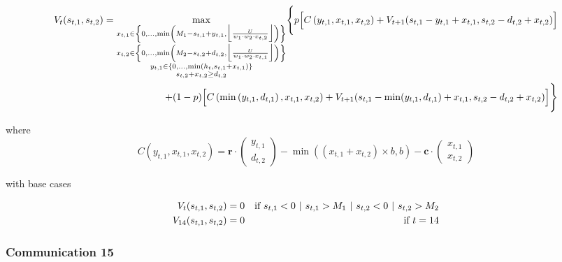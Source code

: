 \documentclass{article}
\newcommand{\bs}[1]{\boldsymbol{#1}} %
\begin{document}
\begin{align*}
    V_t(s_{t,1},s_{t,2}) = \underset{\substack{x_{t,1} \in \left\{0,...,\min\left(M_1 - s_{t,1} + y_{t,1},\Big\lfloor \frac{U}{w_1\cdot w_2 \cdot x_{t,2}} \Big\rfloor\right)\right\} \\ x_{t,2} \in \left\{0,...,\min\left(M_2 - s_{t,2} + d_{t,2}, \Big\lfloor \frac{U}{w_1\cdot w_2\cdot x_{t,1}} \Big\rfloor\right)\right\} \\ y_{t,1} \in \left\{0,...,\min\left(h_{t}, s_{t,1} + x_{t,1}\right)\right\} \\ s_{t,2} + x_{t,2} \geq d_{t,2} }}{\max} \Biggl\{p \Bigl[C\left(y_{t,1}, x_{t,1}, x_{t,2}\right) + V_{t+1}(s_{t,1} - y_{t,1}+x_{t,1}, s_{t,2} - d_{t,2} + x_{t,2}) \Bigr] \Biggr. \\
    \Biggl.+ (1-p)\Bigl[ C\left(\min\left(y_{t,1},d_{t,1}\right), x_{t,1}, x_{t,2}\right) + V_{t+1}(s_{t,1} - \min(y_{t,1},d_{t,1})+x_{t,1}, s_{t,2} - d_{t,2} + x_{t,2})  \Bigr] \Biggr\} 
\end{align*}

where
$$C(y_{t,1}, x_{t,1}, x_{t,2}) = \bs{r}\cdot\begin{pmatrix}y_{t,1}\\d_{t,2}\end{pmatrix} - \min\left((x_{t,1} + x_{t,2}) \times b, b\right) - \bs{c}\cdot\begin{pmatrix}x_{t,1}\\x_{t,2}\end{pmatrix}$$


with base cases

\begin{align}
    V_t(s_{t,1},s_{t,2}) &= 0 & \text{if } s_{t,1} < 0 \hspace{0.125cm} | \hspace{0.125cm} s_{t,1} > M_1 \hspace{0.125cm} | \hspace{0.125cm} s_{t,2} < 0 \hspace{0.125cm} | \hspace{0.125cm} s_{t,2} > M_2 \\
    V_{14}(s_{t,1},s_{t,2}) &= 0 & \text{if } t = 14
\end{align}


\bigskip
\subsubsection{Communication 15}
\end{document}
